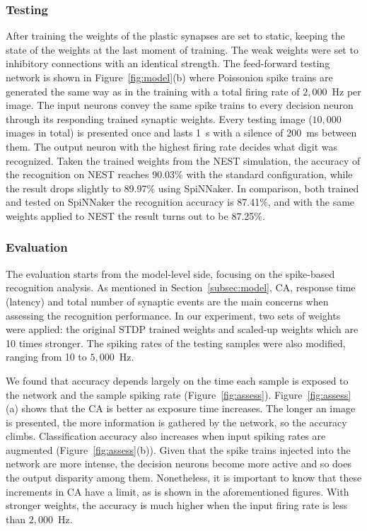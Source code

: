\documentclass{frontiersENG} %
\begin{document}
\subsubsection{Testing}
After training the weights of the plastic synapses are set to static, keeping the state of the weights at the last moment of training.
The weak weights were set to inhibitory connections with an identical strength.
The feed-forward testing network is shown in Figure~\ref{fig:model}(b) where Poissonion spike trains are generated the same way as in the training with a total firing rate of $2,000$~Hz per image.
The input neurons convey the same spike trains to every decision neuron through its responding trained synaptic weights. 
Every testing image ($10,000$ images in total) is presented once and lasts 1~s with a silence of 200~ms between them.
The output neuron with the highest firing rate decides what digit was recognized.
Taken the trained weights from the NEST simulation, the accuracy of the recognition on NEST reaches 90.03\% with the standard configuration, while the result drops slightly to 89.97\% using SpiNNaker.
In comparison, both trained and tested on SpiNNaker the recognition accuracy is 87.41\%, and with the same weights applied to NEST the result turns out to be 87.25\%. 

\subsubsection{Evaluation}
The evaluation starts from the model-level side, focusing on the spike-based recognition analysis.
As mentioned in Section~\ref{subsec:model}, CA, response time (latency) and total number of synaptic events are the main concerns when assessing the recognition performance.
In our experiment, two sets of weights were applied: the original STDP trained weights and scaled-up weights which are 10 times stronger.
The spiking rates of the testing samples were also modified, ranging from 10 to $5,000$~Hz.

We found that accuracy depends largely on the time each sample is exposed to the network and the sample spiking rate (Figure~\ref{fig:assess}).
Figure~\ref{fig:assess}(a) shows that the CA is better as exposure time increases. The longer an image is presented, the more information is gathered by the network, so the accuracy climbs.
Classification accuracy also increases when input spiking rates are augmented (Figure~\ref{fig:assess}(b)).
Given that the spike trains injected into the network are more intense, the decision neurons become more active and so does the output disparity among them.
Nonetheless, it is important to know that these increments in CA have a limit, as is shown in the aforementioned figures.
With stronger weights, the accuracy is much higher when the input firing rate is less than $2,000$~Hz.
\end{document}
